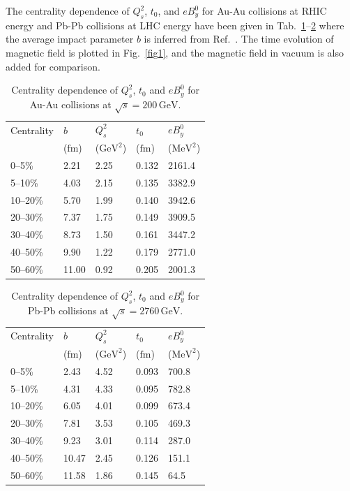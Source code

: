 \documentclass[preprint]{elsarticle}
\begin{document}
The centrality dependence of $Q_s^2$, $t_0$, and $eB_y^0$ for Au-Au collisions at RHIC energy and Pb-Pb collisions at LHC energy have been given in Tab.~\ref{tab:RHICdata}--\ref{tab:LHCdata} where the average impact parameter $b$ is inferred from Ref.~\cite{Ray:2007av,Abelev:2013qoq}. The time evolution of magnetic field is plotted in Fig.~\ref{fig1}, and the magnetic field in vacuum is also added for comparison.



\begin{table}
\centering
\caption{\label{tab:RHICdata}Centrality dependence  of $Q_s^2$, $t_0$ and $eB_y^0$ for Au-Au collisions at $\sqrt{s} = 200\,\mathrm{GeV}$.}
\begin{tabular}{lllll}
\hline
  Centrality & $b$ & $Q_s^2$ & $t_0$ & $eB_y^0$ \\
             & ($\mathrm{fm}$)  &  ($\mathrm{GeV}^2$) & ($\mathrm{fm}$) & ($\mathrm{MeV}^2$) \\
\hline
0--5\% & 2.21 & 2.25 & 0.132 & 2161.4 \\
5--10\% & 4.03 & 2.15 & 0.135 & 3382.9 \\
10--20\% & 5.70 & 1.99 & 0.140 & 3942.6 \\
20--30\% & 7.37 & 1.75 & 0.149 & 3909.5 \\
30--40\% & 8.73 & 1.50 & 0.161 & 3447.2 \\
40--50\% & 9.90 & 1.22 & 0.179 & 2771.0 \\
50--60\% & 11.00 & 0.92 & 0.205 & 2001.3 \\
  \hline
\end{tabular}
\end{table}

\begin{table}
\centering
\caption{\label{tab:LHCdata}Centrality dependence of $Q_s^2$, $t_0$ and $eB_y^0$ for Pb-Pb collisions at $\sqrt{s} = 2760\,\mathrm{GeV}$.}
\begin{tabular}{lllll}
\hline
  Centrality & $b$ & $Q_s^2$ & $t_0$ & $eB_y^0$ \\
             & ($\mathrm{fm}$)  &  ($\mathrm{GeV}^2$) & ($\mathrm{fm}$) & ($\mathrm{MeV}^2$) \\
\hline
0--5\% & 2.43 & 4.52 & 0.093 & 700.8 \\
5--10\% & 4.31 & 4.33 & 0.095 & 782.8 \\
10--20\% & 6.05 & 4.01 & 0.099 & 673.4 \\
20--30\% & 7.81 & 3.53 & 0.105 & 469.3 \\
30--40\% & 9.23 & 3.01 & 0.114 & 287.0 \\
40--50\% & 10.47 & 2.45 & 0.126 & 151.1 \\
50--60\% & 11.58 & 1.86 & 0.145 & 64.5 \\
  \hline
\end{tabular}
\end{table}
\end{document}
